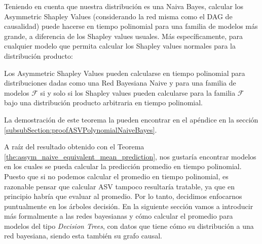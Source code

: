 Teniendo en cuenta que nuestra distribución es una Naiva Bayes, calcular los Asymmetric Shapley Values (considerando la red misma como el DAG de causalidad) puede hacerse en tiempo polinomial para una familia de modelos más grande, a diferencia de los Shapley values usuales. Más específicamente, para cualquier modelo que permita calcular los Shapley values normales para la distribución producto:


\begin{theorem}\label{the:assym_naive_equivalent_mean_prediction}
Los Asymmetric Shapley Values pueden calcularse en tiempo polinomial para distribuciones dadas como una Red Bayesiana Naive y para una familia de modelos \(\mathcal{F}\) si y solo si los Shapley values pueden calcularse para la familia \(\mathcal{F}\) bajo una distribución producto arbitraria en tiempo polinomial.
\end{theorem}

La demostración de este teorema la pueden encontrar en el apéndice en la sección \ref{subsubSection:proofASVPolynomialNaiveBayes}.

A raíz del resultado obtenido con el Teorema \ref{the:assym_naive_equivalent_mean_prediction}, nos gustaría encontrar modelos en los cuales se pueda calcular la predicción promedio en tiempo polinomial. Puesto que si no podemos calcular el promedio en tiempo polinomial, es razonable pensar que calcular ASV tampoco resultaría tratable, ya que en principio habría que evaluar al promedio. Por lo tanto, decidimos enfocarnos puntualmente en los árboles decisión. En la siguiente sección vamos a introducir más formalmente a las redes bayesianas y cómo calcular el promedio para modelos del tipo \emph{Decision Trees}, con datos que tiene cómo su distribución a una red bayesiana, siendo esta también su grafo causal. 


